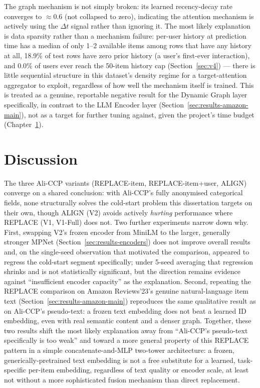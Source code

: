 \documentclass{uclthesis}
\begin{document}
The graph mechanism is not simply broken: its learned recency-decay rate converges to $\approx 0.6$ (not collapsed to zero), indicating the attention mechanism is actively using the $\Delta t$ signal rather than ignoring it. The most likely explanation is data sparsity rather than a mechanism failure: per-user history at prediction time has a median of only 1--2 available items among rows that have any history at all, 18.9\% of test rows have zero prior history (a user's first-ever interaction), and 0.0\% of users ever reach the 50-item history cap (Section~\ref{sec:v4}) --- there is little sequential structure in this dataset's density regime for a target-attention aggregator to exploit, regardless of how well the mechanism itself is trained. This is treated as a genuine, reportable negative result for the Dynamic Graph layer specifically, in contrast to the LLM Encoder layer (Section~\ref{sec:results-amazon-main}), not as a target for further tuning against, given the project's time budget (Chapter~\ref{chap:discussion}).

\chapter{Discussion}
\label{chap:discussion}
The three Ali-CCP variants (REPLACE-item, REPLACE-item+user, ALIGN) converge on a shared conclusion: with Ali-CCP's fully anonymised categorical fields, none structurally solves the cold-start problem this dissertation targets on their own, though ALIGN (V2) avoids actively \emph{hurting} performance where REPLACE (V1, V1-Full) does not. Two further experiments narrow down why. First, swapping V2's frozen encoder from MiniLM to the larger, generally stronger MPNet (Section~\ref{sec:results-encoders}) does not improve overall results and, on the single-seed observation that motivated the comparison, appeared to regress the cold-start segment specifically; under 5-seed averaging that regression shrinks and is not statistically significant, but the direction remains evidence against ``insufficient encoder capacity'' as the explanation. Second, repeating the REPLACE comparison on Amazon Reviews'23's genuine natural-language item text (Section~\ref{sec:results-amazon-main}) reproduces the same qualitative result as on Ali-CCP's pseudo-text: a frozen text embedding does not beat a learned ID embedding, even with real semantic content and a denser graph. Together, these two results shift the most likely explanation away from ``Ali-CCP's pseudo-text specifically is too weak'' and toward a more general property of this REPLACE pattern in a simple concatenate-and-MLP two-tower architecture: a frozen, generically-pretrained text embedding is not a free substitute for a learned, task-specific per-item embedding, regardless of text quality or encoder scale, at least not without a more sophisticated fusion mechanism than direct replacement.
\end{document}
